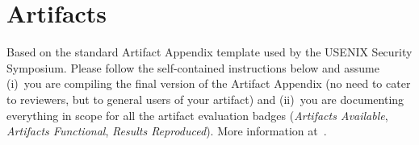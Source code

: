 \section*{Artifacts}\label{s:artifact-appendix}

Based on the standard Artifact Appendix template used by the USENIX Security
Symposium. Please follow the self-contained instructions below and assume
(i)~you are compiling the final version of the Artifact Appendix (no need to
cater to reviewers, but to general users of your artifact) and (ii)~you are
documenting everything in scope for all the artifact evaluation badges
(\emph{Artifacts Available}, \emph{Artifacts Functional}, \emph{Results
Reproduced}). More information at~\cite{secartifacts}.




